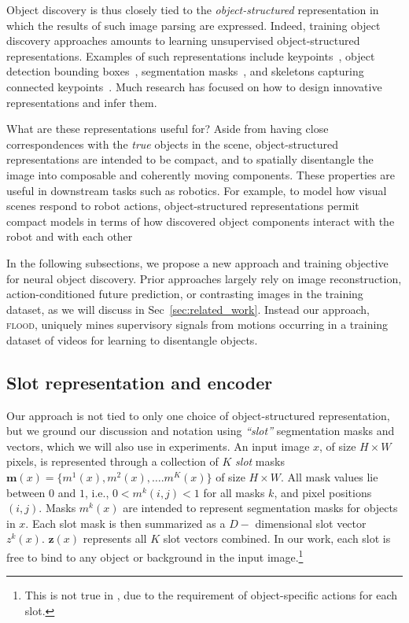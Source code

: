 \documentclass{article}
\begin{document}
Object discovery is thus closely tied to the \emph{object-structured} representation in which the results of such image parsing are expressed. Indeed, training object discovery approaches amounts to learning unsupervised object-structured representations. Examples of such representations include keypoints~\cite{jakab2018unsupervised, Kulkarni2019UnsupervisedLO}, object detection bounding boxes~\cite{Cho_2015_CVPR}, segmentation masks~\cite{greff2019multi, kipf2019contrastive}, and skeletons capturing connected keypoints~\cite{jakab2020self}. Much research has focused on how to design innovative representations and infer them.

What are these representations useful for? Aside from having close correspondences with the \emph{true} objects in the scene, object-structured representations are intended to be compact, and to spatially disentangle the image into composable and coherently moving components. These properties are useful in downstream tasks such as robotics. For example, to model how visual scenes respond to robot actions, object-structured representations permit compact models in terms of how discovered object components interact with the robot and with each other~\cite{minderer2019unsupervised, Kulkarni2019UnsupervisedLO, kipf2019contrastive, lambeta2020digit} %



 

In the following subsections, we propose a new approach and training objective for neural object discovery. Prior approaches largely rely on image reconstruction, action-conditioned future prediction, or contrasting images in the training dataset, as we will discuss in Sec~\ref{sec:related_work}. Instead our approach, \textsc{flood}, uniquely mines supervisory signals from motions occurring in a training dataset of videos for learning to disentangle objects.  

\subsection{Slot representation and encoder}\label{sec:slots}
Our approach is not tied to only one choice of object-structured representation, but we ground our discussion and notation using \emph{``slot''} segmentation masks and vectors, which we will also use in experiments. An input image $x$, of size $H \times W$ pixels, is represented through a collection of $K$ \emph{slot} masks $ \bm{m}(x) = \{m^1(x), m^2(x), \dots. m^K(x) \}$  of size $H\times W$. All mask values lie between $0$ and $1$, i.e., $0 < m^k(i, j) < 1$ for all masks $k$, and pixel positions $(i, j)$. Masks $m^k(x)$ are intended to represent segmentation masks for objects in $x$. Each slot mask is then summarized as a $D-$ dimensional slot vector $z^k(x)$. $\bm{z}(x)$ represents all $K$ slot vectors combined. In our work, each slot is free to bind to any object or background in the input image.\footnote{This is not true in \citet{kipf2019contrastive}, due to the requirement of object-specific actions for each slot.}
\end{document}
